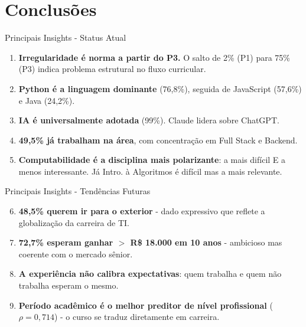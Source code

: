 \documentclass[fleqn]{beamer}
\begin{document}
\section{Conclusões}

\begin{frame}{Principais Insights - Status Atual}
\begin{enumerate}
    \item \textbf{Irregularidade é norma a partir do P3.} O salto de 2\% (P1) para 75\% (P3) indica problema estrutural no fluxo curricular.

    \item \textbf{Python é a linguagem dominante} (76,8\%), seguida de JavaScript (57,6\%) e Java (24,2\%).

    \item \textbf{IA é universalmente adotada} (99\%). Claude lidera sobre ChatGPT.

    \item \textbf{49,5\% já trabalham na área}, com concentração em Full Stack e Backend.

    \item \textbf{Computabilidade é a disciplina mais polarizante}: a mais difícil E a menos interessante. Já Intro. à Algoritmos é difícil mas a mais relevante.
\end{enumerate}
\end{frame}

\begin{frame}{Principais Insights - Tendências Futuras}
\begin{enumerate}
    \setcounter{enumi}{5}
    \item \textbf{48,5\% querem ir para o exterior} - dado expressivo que reflete a globalização da carreira de TI.

    \item \textbf{72,7\% esperam ganhar $>$ R\$ 18.000 em 10 anos} - ambicioso mas coerente com o mercado sênior.

    \item \textbf{A experiência não calibra expectativas}: quem trabalha e quem não trabalha esperam o mesmo.

    \item \textbf{Período acadêmico é o melhor preditor de nível profissional} ($\rho = 0,714$) - o curso se traduz diretamente em carreira.
\end{enumerate}
\end{frame}
\end{document}
